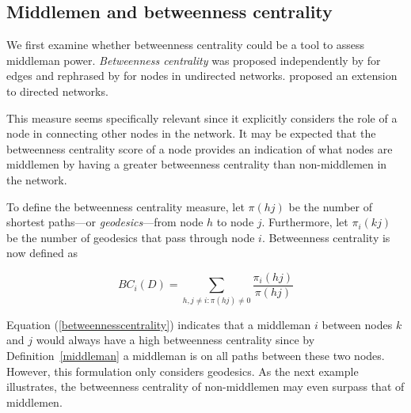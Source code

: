 \documentclass[11pt,fleqn]{article}
\begin{document}
\subsection{Middlemen and betweenness centrality}

We first examine whether betweenness centrality could be a tool to assess middleman power. \emph{Betweenness centrality} was proposed independently by \citet{Anthonisse1971} for edges and rephrased by \citet{Freeman1977} for nodes in undirected networks. \citet{White1994} proposed an extension to directed networks.

This measure seems specifically relevant since it explicitly considers the role of a node in connecting other nodes in the network. It may be expected that the betweenness centrality score of a node provides an indication of what nodes are middlemen by having a greater betweenness centrality than non-middlemen in the network.

To define the betweenness centrality measure, let $\pi(hj)$ be the number of shortest paths---or \emph{geodesics}---from node $h$ to node $j$. Furthermore, let $\pi_{i}(kj)$ be the number of geodesics that pass through node $i$. Betweenness centrality is now defined as

\begin{equation} \label{betweennesscentrality}
BC_{i}(D) = \sum_{h,j \neq i \colon \pi(hj) \neq 0} \frac{\pi_{i}(hj)}{\pi(hj)}
\end{equation}

Equation (\ref{betweennesscentrality}) indicates that a middleman $i$ between nodes $k$ and $j$ would always have a high betweenness centrality since by Definition~\ref{middleman} a middleman is on all paths between these two nodes. However, this formulation only considers geodesics. As the next example illustrates, the betweenness centrality of non-middlemen may even surpass that of middlemen.
\end{document}
